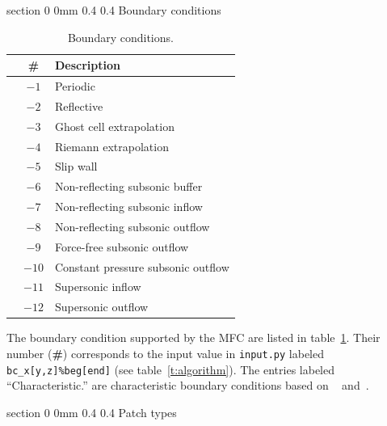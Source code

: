 \documentclass[11pt]{article}
\makeatletter
\renewcommand{\section}{\@startsection
{section}%
{0}%
{0mm}%
{0.4\baselineskip}%
{0.4\baselineskip}%
{\normalfont\Large\bfseries\color{myBrown}}}%
\newcommand\tablefont{\footnotesize}
\makeatother
\begin{document}
\newpage



\newpage
\appendix

\section{Boundary conditions}\label{s:bcs}

\begin{table}[H]
	\centering
	{\tablefont
	\begin{tabular}{ | c | c | l | }
	\hline
		  & \textbf{\#} & \textbf{Description} \\
		\hline
		\parbox[t]{2.5mm}{} 
		& $-1$ & Periodic\\
		& $-2$ & Reflective\\
		& $-3$ & Ghost cell extrapolation \\
		& $-4$ & Riemann extrapolation \\
		& $-5$ & Slip wall \\
		\hline
		\parbox[t]{2.5mm}{} 
		& $-6$ & Non-reflecting subsonic buffer \\
		& $-7$ & Non-reflecting subsonic inflow \\
		& $-8$ & Non-reflecting subsonic outflow \\
		& $-9$ & Force-free subsonic outflow \\
		& $-10$ & Constant pressure subsonic outflow \\
		& $-11$ & Supersonic inflow \\
		& $-12$ & Supersonic outflow \\
		\hline
	\end{tabular}}
	\caption{Boundary conditions.}
	\label{t:bcs}
\end{table}
	
The boundary condition supported by the MFC are listed in table~\ref{t:bcs}. Their number (\textbf{\#})
corresponds to the input value in \texttt{input.py} labeled \texttt{bc\_x[y,z]\%beg[end]} (see table~\ref{t:algorithm}).
The entries labeled ``Characteristic.'' are characteristic boundary conditions based on ~\citet{Thompson87}
and~\citet{Thompson90}.

\section{Patch types}\label{s:patches}
\end{document}
